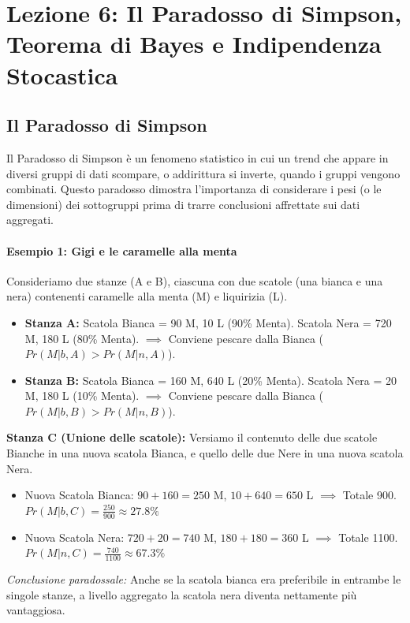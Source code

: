 \documentclass[12pt, a4paper]{article}
\begin{document}
\section{Lezione 6: Il Paradosso di Simpson, Teorema di Bayes e Indipendenza Stocastica}

\subsection{Il Paradosso di Simpson}
Il Paradosso di Simpson è un fenomeno statistico in cui un trend che appare in diversi gruppi di dati scompare, o addirittura si inverte, quando i gruppi vengono combinati. Questo paradosso dimostra l'importanza di considerare i pesi (o le dimensioni) dei sottogruppi prima di trarre conclusioni affrettate sui dati aggregati.

\paragraph{Esempio 1: Gigi e le caramelle alla menta}
Consideriamo due stanze (A e B), ciascuna con due scatole (una bianca e una nera) contenenti caramelle alla menta (M) e liquirizia (L).
\begin{itemize}
    \item \textbf{Stanza A:} 
    Scatola Bianca = 90 M, 10 L (90\% Menta). 
    Scatola Nera = 720 M, 180 L (80\% Menta).
    $\implies$ Conviene pescare dalla Bianca ($Pr(M|b,A) > Pr(M|n,A)$).
    \item \textbf{Stanza B:} 
    Scatola Bianca = 160 M, 640 L (20\% Menta). 
    Scatola Nera = 20 M, 180 L (10\% Menta).
    $\implies$ Conviene pescare dalla Bianca ($Pr(M|b,B) > Pr(M|n,B)$).
\end{itemize}
\textbf{Stanza C (Unione delle scatole):}
Versiamo il contenuto delle due scatole Bianche in una nuova scatola Bianca, e quello delle due Nere in una nuova scatola Nera.
\begin{itemize}
    \item Nuova Scatola Bianca: $90 + 160 = 250$ M, $10 + 640 = 650$ L $\implies$ Totale 900. $Pr(M|b,C) = \frac{250}{900} \approx 27.8\%$
    \item Nuova Scatola Nera: $720 + 20 = 740$ M, $180 + 180 = 360$ L $\implies$ Totale 1100. $Pr(M|n,C) = \frac{740}{1100} \approx 67.3\%$
\end{itemize}
\textit{Conclusione paradossale:} Anche se la scatola bianca era preferibile in entrambe le singole stanze, a livello aggregato la scatola nera diventa nettamente più vantaggiosa.
\end{document}
